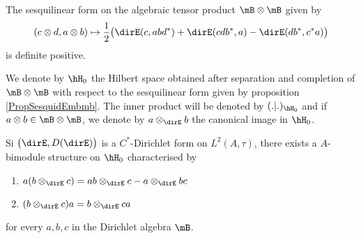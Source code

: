 \begin{proposition}		\label{PropSesquidEmbmb}
	The sesquilinear form on the algebraic tensor product $\mB\otimes\mB$ given by
	\begin{equation}
		(c\otimes d,a\otimes b)\mapsto\frac{ 1 }{2}\big( \dirE(c,abd^*)+\dirE(cdb^*,a)-\dirE(db^*,c^*a) \big)
	\end{equation}
	is definite positive.
\end{proposition}

We denote by $\hH_0$ the Hilbert space obtained after separation\cite{AlgOpGirard} and completion of $\mB\otimes\mB$ with respect to the sesquilinear form given by proposition \ref{PropSesquidEmbmb}. The inner product will be denoted by $(.|.)_{\hH_0}$ and if $a\otimes b\in\mB\otimes\mB$, we denote by $a\otimes_{\dirE}b$ the canonical image in $\hH_0$.

\begin{theorem}
	Si $\big( \dirE,D(\dirE) \big)$ is a $C^*$-Dirichlet form on $L^2(A,\tau)$, there exists a $A$-bimodule structure on $\hH_0$ characterised by
	\begin{enumerate}
		\item
			$a(b\otimes_{\dirE}c)=ab\otimes_{\dirE}c-a\otimes_{\dirE}bc$
		\item
			$(b\otimes_{\dirE}c)a=b\otimes_{\dirE}ca$
	\end{enumerate}
	for every $a,b,c$ in the Dirichlet algebra $\mB$.
\end{theorem}
